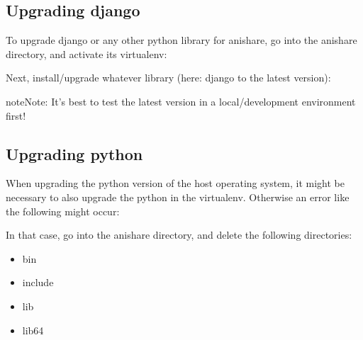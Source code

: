 \documentclass[letterpaper,10pt,openany,oneside,english]{sphinxmanual}
\begin{document}
\subsection{Upgrading django}
\label{\detokenize{index:upgrading-django}}
To upgrade django or any other python library for anishare, go into the anishare directory, and
activate its virtualenv:

%
\begin{sphinxVerbatim}[commandchars=\\\{\}]
 
 
\end{sphinxVerbatim}

Next, install/upgrade whatever library (here: django to the latest version):

%
\begin{sphinxVerbatim}[commandchars=\\\{\}]
   
\end{sphinxVerbatim}

\begin{sphinxadmonition}{note}{Note:}
It’s best to test the latest version in a local/development environment first!
\end{sphinxadmonition}


\subsection{Upgrading python}
\label{\detokenize{index:upgrading-python}}
When upgrading the python version of the host operating system, it might be necessary to also
upgrade the python in the virtualenv. Otherwise an error like the following might occur:
\begin{quote}

\end{quote}

In that case, go into the anishare directory, and delete the following directories:
\begin{itemize}
\item {} 
bin

\item {} 
include

\item {} 
lib

\item {} 
lib64

\end{itemize}
\end{document}

